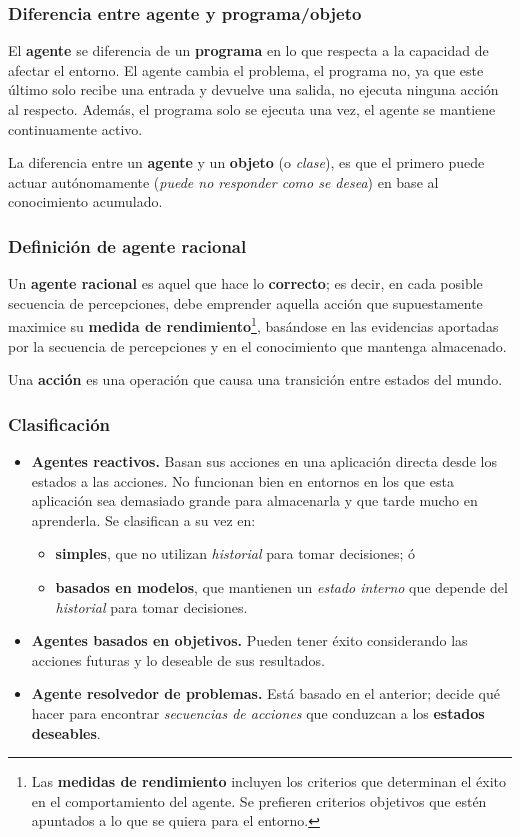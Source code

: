 \documentclass[10pt,a4paper]{article}
\begin{document}
\subsubsection{Diferencia entre agente y programa/objeto}

El \textbf{agente} se diferencia de un \textbf{programa} en lo que respecta a la capacidad de afectar el entorno. El agente cambia el problema, el programa no, ya que este último solo recibe una entrada y devuelve una salida, no ejecuta ninguna acción al respecto. Además, el programa solo se ejecuta una vez, el agente se mantiene continuamente activo.

La diferencia entre un \textbf{agente} y un \textbf{objeto} (o \textit{clase}), es que el primero puede actuar autónomamente (\textit{puede no responder como se desea}) en base al conocimiento acumulado.

\subsubsection{Definición de agente racional}

Un \textbf{agente racional} es aquel que hace lo \textbf{correcto}; es decir, en cada posible secuencia de percepciones, debe emprender aquella acción que supuestamente maximice su \textbf{medida de rendimiento}\footnote{Las \textbf{medidas de rendimiento} incluyen los criterios que determinan el éxito en el comportamiento del agente. Se prefieren criterios objetivos que estén apuntados a lo que se quiera para el entorno.}, basándose en las evidencias aportadas por la secuencia de percepciones y en el conocimiento que mantenga almacenado.

Una \textbf{acción} es una operación que causa una transición entre estados del mundo.

\subsubsection{Clasificación}

\begin{itemize}
\item \textbf{Agentes reactivos.} Basan sus acciones en una aplicación directa desde los estados a las acciones. No funcionan bien en entornos en los que esta aplicación sea demasiado grande para almacenarla y que tarde mucho en aprenderla. Se clasifican a su vez en:
\begin{itemize}
\item \textbf{simples}, que no utilizan \textit{historial} para tomar decisiones; ó \item \textbf{basados en modelos}, que mantienen un \textit{estado interno} que depende del \textit{historial} para tomar decisiones.
\end{itemize} 
\item \textbf{Agentes basados en objetivos.} Pueden tener éxito considerando las acciones futuras y lo deseable de sus resultados.
\item \textbf{Agente resolvedor de problemas.} Está basado en el anterior; decide qué hacer para encontrar \textit{secuencias de acciones} que conduzcan a los \textbf{estados deseables}.
\end{itemize}
\end{document}
